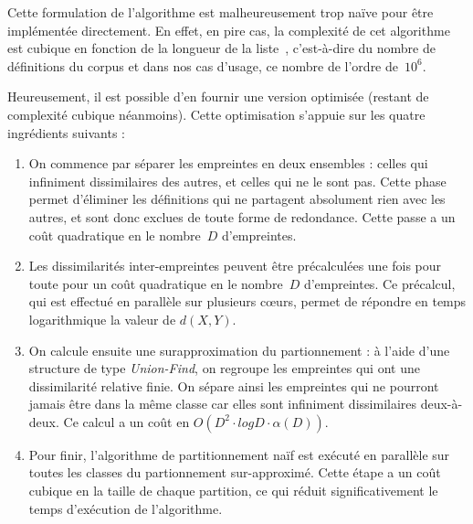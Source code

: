 Cette formulation de l'algorithme est malheureusement trop naïve pour
être implémentée directement. En effet, en pire cas, la complexité de
cet algorithme est cubique en fonction de la longueur de la
liste~, c'est-à-dire du nombre de définitions du
corpus et dans nos cas d'usage, ce nombre de l'ordre de~$10^6$.

Heureusement, il est possible d'en fournir une version optimisée
(restant de complexité cubique néanmoins). Cette optimisation
s'appuie sur les quatre ingrédients suivants :

\begin{enumerate}
\item
  On commence par séparer les empreintes en deux ensembles : celles
  qui infiniment dissimilaires des autres, et celles qui ne le sont
  pas. Cette phase permet d'éliminer les définitions qui ne partagent
  absolument rien avec les autres, et sont donc exclues de toute
  forme de redondance. Cette passe a un coût quadratique en le
  nombre~$D$ d'empreintes.
\item
  Les dissimilarités inter-empreintes peuvent être précalculées une
  fois pour toute pour un coût quadratique en le nombre~$D$
  d'empreintes.  Ce précalcul, qui est effectué en parallèle sur
  plusieurs c{\oe}urs, permet de répondre en temps logarithmique
  la valeur de $d(X, Y)$.
\item
  On calcule ensuite une surapproximation du partionnement : à l'aide
  d'une structure de type \textit{Union-Find}, on regroupe les
  empreintes qui ont une dissimilarité relative finie. On sépare ainsi
  les empreintes qui ne pourront jamais être dans la même classe car
  elles sont infiniment dissimilaires deux-à-deux. Ce calcul a un coût
  en $O(D^2 \cdot log D \cdot \alpha(D))$. 
\item
  Pour finir, l'algorithme de partitionnement naïf est exécuté en
  parallèle sur toutes les classes du partionnement sur-approximé.
  Cette étape a un coût cubique en la taille de chaque partition, ce
  qui réduit significativement le temps d'exécution de l'algorithme.

\end{enumerate}
